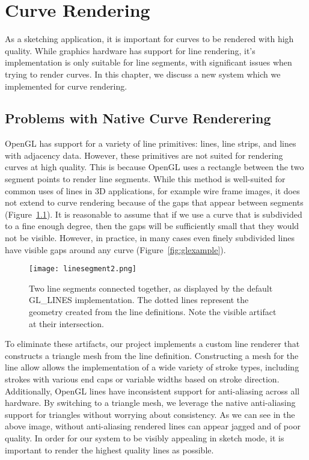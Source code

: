 \chapter{Curve Rendering}

As a sketching application, it is important for curves to be rendered with high quality.
While graphics hardware has support for line rendering, it's implementation is only suitable for line segments, with significant issues when trying to render curves.
In this chapter, we discuss a new system which we implemented for curve rendering.

\section{Problems with Native Curve Renderering}
OpenGL has support for a variety of line primitives: lines, line strips, and lines with adjacency data.
However, these primitives are not suited for rendering curves at high quality.
This is because OpenGL uses a rectangle between the two segment points to render line segments.
While this method is well-suited for common uses of lines in 3D applications, for example wire frame images, it does not extend to curve rendering because of the gaps that appear between segments (Figure~\ref{fig:gllineartifact}).
It is reasonable to assume that if we use a curve that is subdivided to a fine enough degree, then the gaps will be sufficiently small that they would not be visible.
However, in practice, in many cases even finely subdivided lines have visible gaps around any curve (Figure~\ref{fig:glexample}). 

\begin{figure}
\label{fig:gllineartifact}
	\texttt{[image: linesegment2.png]}
	\caption[Artifacts with GL\_LINES]{Two line segments connected together, as displayed by the default GL\_LINES implementation. The dotted lines represent the geometry created from the line definitions. Note the visible artifact at their intersection.}
\end{figure}

To eliminate these artifacts, our project implements a custom line renderer that constructs a triangle mesh from the line definition.
Constructing a mesh for the line allow allows the implementation of a wide variety of stroke types, including strokes with various end caps or variable widths based on stroke direction. 
Additionally, OpenGL lines have inconsistent support for anti-aliasing across all hardware.
By switching to a triangle mesh, we leverage the native anti-aliasing support for triangles without worrying about consistency.
As we can see in the above image, without anti-aliasing rendered lines can appear jagged and of poor quality.
In order for our system to be visibly appealing in sketch mode, it is important to render the highest quality lines as possible.

